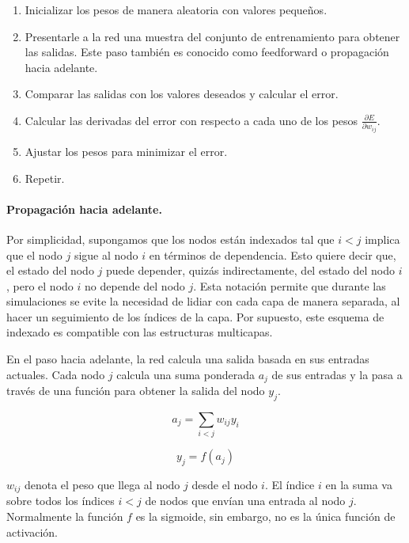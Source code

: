 \begin{enumerate}
    \item Inicializar los pesos de manera aleatoria con valores pequeños.
    \item Presentarle a la red una muestra del conjunto de entrenamiento para obtener las salidas. Este paso 
    también es conocido como feedforward o propagación hacia adelante.
    \item Comparar las salidas con los valores deseados y calcular el error.
    \item Calcular las derivadas del error con respecto a cada uno de los pesos $\frac{\partial E}{\partial w_{ij}}$.
    \item Ajustar los pesos para minimizar el error.
    \item Repetir.
\end{enumerate}




\paragraph{Propagación hacia adelante.}

Por simplicidad, supongamos que los nodos están indexados tal que $i < j$ implica que 
el nodo $j$ sigue al nodo $i$ en términos de dependencia. Esto quiere decir que,
el estado del nodo $j$ puede depender, quizás indirectamente, del estado 
del nodo $i$, pero el nodo $i$ no depende del nodo $j$. Esta notación permite que durante
las simulaciones se evite la necesidad de lidiar con cada capa de manera separada,
al hacer un seguimiento de los índices de la capa. Por supuesto, este esquema de
indexado es compatible con las estructuras multicapas.

En el paso hacia adelante, la red calcula una salida basada en sus entradas actuales. Cada nodo
$j$ calcula una suma ponderada $a_j$ de sus entradas y la pasa a través de una función
para obtener la salida del nodo $y_j$.

\[
a_j = \sum_{i < j} w_{ij} y_i
\]

\[
y_j = f(a_j)
\]

$w_{ij}$ denota el peso que llega al nodo $j$ desde el nodo $i$. El índice $i$ en la suma
va sobre todos los índices $i < j$ de nodos que envían una entrada al nodo $j$. Normalmente
la función $f$ es la sigmoide, sin embargo, no es la única función de activación.

